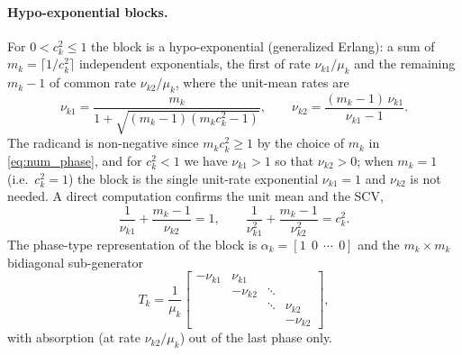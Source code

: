 \documentclass{article}
\begin{document}
\paragraph{Hypo-exponential blocks.} For $0 < c_k^2 \le 1$ the block is a hypo-exponential (generalized Erlang): a sum of $m_k = \lceil 1/c_k^2 \rceil$ independent exponentials, the first of rate $\nu_{k1}/\mu_k$ and the remaining $m_k - 1$ of common rate $\nu_{k2}/\mu_k$, where the unit-mean rates are
\begin{equation}
\label{eq:hypo-rates}
\nu_{k1} = \frac{m_k}{1+\sqrt{(m_k-1)(m_k c_{k}^2-1)}},
\qquad
\nu_{k2} =  \frac{(m_k-1)\,\nu_{k1}}{\nu_{k1}-1}.
\end{equation}
The radicand is non-negative since $m_k c_k^2 \ge 1$ by the choice of $m_k$ in \eqref{eq:num_phase}, and for $c_k^2 < 1$ we have $\nu_{k1} > 1$ so that $\nu_{k2} > 0$; when $m_k = 1$ (i.e.\ $c_k^2 = 1$) the block is the single unit-rate exponential $\nu_{k1} = 1$ and $\nu_{k2}$ is not needed. A direct computation confirms the unit mean and the SCV,
\[
\frac{1}{\nu_{k1}} + \frac{m_k-1}{\nu_{k2}} = 1,
\qquad
\frac{1}{\nu_{k1}^2} + \frac{m_k-1}{\nu_{k2}^2} = c_k^2 .
\]
The phase-type representation of the block is $\alpha_k = [1~~0~~\cdots~~0]$ and the $m_k \times m_k$ bidiagonal sub-generator
\[
T_{k} = \frac{1}{\mu_{k}}
\begin{bmatrix}
-\nu_{k1} & \nu_{k1} & & \\
 & -\nu_{k2} & \ddots & \\
 & & \ddots & \nu_{k2}\\
 & & & -\nu_{k2}
\end{bmatrix},
\]
with absorption (at rate $\nu_{k2}/\mu_k$) out of the last phase only.
\end{document}
